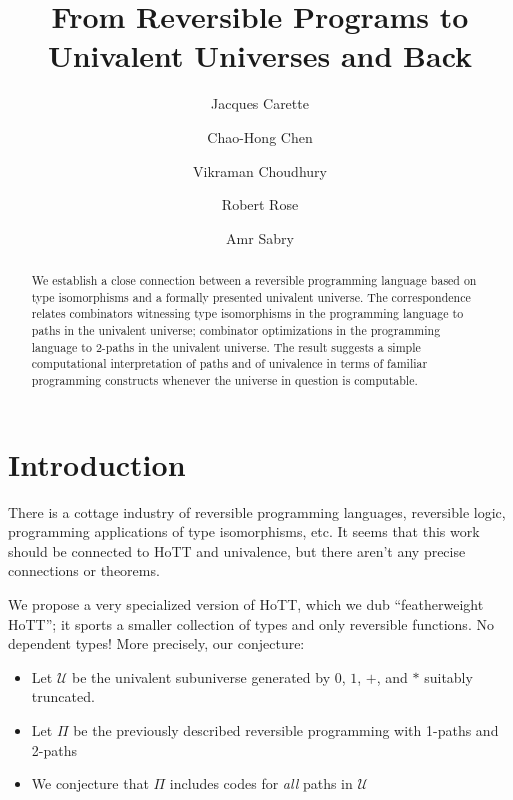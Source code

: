 \documentclass{entcs}
\begin{document}
\begin{frontmatter}
\title{From Reversible Programs to \\ Univalent Universes and Back}
\author{Jacques Carette}
\address{McMaster University}
\author{Chao-Hong Chen}
\address{Indiana University}
\author{Vikraman Choudhury}
\author{Robert Rose}
\author{Amr Sabry}
\address{Indiana University}

\begin{abstract}
  We establish a close connection between a reversible programming language
  based on type isomorphisms and a formally presented univalent universe. The
  correspondence relates combinators witnessing type isomorphisms in the
  programming language to paths in the univalent universe; combinator
  optimizations in the programming language to 2-paths in the univalent
  universe. The result suggests a simple computational interpretation of paths
  and of univalence in terms of familiar programming constructs whenever the
  universe in question is computable.
\end{abstract}

\end{frontmatter}

\section{Introduction}

There is a cottage industry of reversible programming languages, reversible
logic, programming applications of type isomorphisms, etc. It seems that this
work should be connected to HoTT and univalence, but there aren't any precise
connections or theorems.

We propose a very specialized version of HoTT, which we dub
``featherweight HoTT''; it sports a smaller
collection of types and only reversible functions. No dependent types!  More
precisely, our conjecture:

\begin{itemize}
\item Let $\mathcal{U}$ be the univalent subuniverse generated by $0$, $1$, $+$,
  and $*$ suitably truncated.
\item Let $\Pi$ be the previously  described reversible programming with 1-paths and 2-paths
\item We conjecture that $\Pi$ includes codes for \emph{all} paths in $\mathcal{U}$
\end{itemize}
\end{document}
